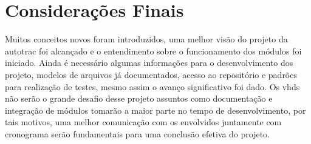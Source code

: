 \section{Considerações Finais}

Muitos conceitos novos foram introduzidos, uma melhor visão do projeto da autotrac foi alcançado e o entendimento sobre o funcionamento dos módulos foi iniciado. Ainda é necessário algumas informações para o desenvolvimento dos projeto, modelos de arquivos já documentados, acesso ao repositório e padrões para realização de testes, mesmo assim o avanço significativo foi dado. Os vhds não serão o grande desafio desse projeto assuntos como documentação e integração de módulos tomarão a maior parte no tempo de desenvolvimento, por tais motivos, uma melhor comunicação com os envolvidos juntamente com cronograma serão fundamentais para uma conclusão efetiva do projeto.  
